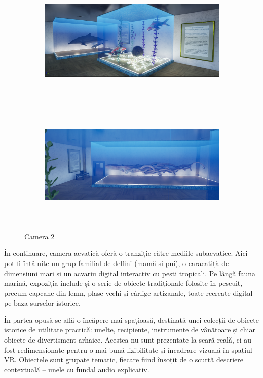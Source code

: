 \begin{figure}[h!]
    \centering
    \begin{subfigure}{0.49\textwidth}
        \includegraphics[width=\linewidth, height=6cm]{continut/capitol3/figuri/camera_2.png}
        \label{fig:Room2}
    \end{subfigure}
    \hfill
    \begin{subfigure}{0.49\textwidth}
        \includegraphics[width=\linewidth, height=6cm]{continut/capitol3/figuri/camera2_2.png}
        \label{fig:Room2}
    \end{subfigure}
    \caption{Camera 2}
\end{figure}

În continuare, camera acvatică oferă o tranziție către mediile subacvatice. Aici pot fi întâlnite un grup familial de delfini (mamă și pui), o caracatiță de dimensiuni mari și un acvariu digital interactiv cu pești tropicali. Pe lângă fauna marină, expoziția include și o serie de obiecte tradiționale folosite în pescuit, precum capcane din lemn, plase vechi și cârlige artizanale, toate recreate digital pe baza surselor istorice.

\newpage 
În partea opusă se află o încăpere mai spațioasă, destinată unei colecții de obiecte istorice de utilitate practică: unelte, recipiente, instrumente de vânătoare și chiar obiecte de divertisment arhaice. Acestea nu sunt prezentate la scară reală, ci au fost redimensionate pentru o mai bună lizibilitate și încadrare vizuală în spațiul VR. Obiectele sunt grupate tematic, fiecare fiind însoțit de o scurtă descriere contextuală – unele cu fundal audio explicativ.

